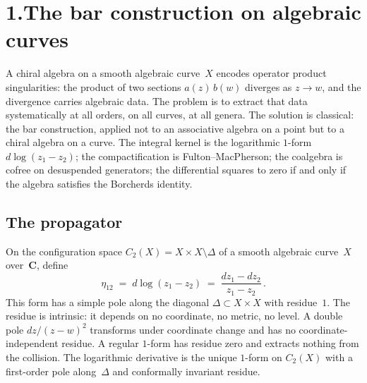 \providecommand{\cA}{\mathcal{A}}
\providecommand{\barB}{\overline{B}}
\providecommand{\gAmod}{\mathfrak{g}_{\cA}^{\mathrm{mod}}}
\providecommand{\MC}{\text{MC}}

\section*{1.\quad The bar construction on algebraic curves}

\medskip

\noindent
A chiral algebra on a smooth algebraic curve~$X$ encodes
operator product singularities: the product of two sections
$a(z)\,b(w)$ diverges as $z\to w$, and the divergence carries
algebraic data. The problem is to extract that data systematically
at all orders, on all curves, at all genera. The solution is
classical: the bar construction, applied not to an associative
algebra on a point but to a chiral algebra on a curve. The integral
kernel is the logarithmic $1$-form $d\log(z_1-z_2)$; the
compactification is Fulton--MacPherson; the coalgebra is cofree
on desuspended generators; the differential squares to zero if and
only if the algebra satisfies the Borcherds identity.

\subsection*{The propagator}

\noindent
On the configuration space $C_2(X) = X \times X \setminus \Delta$
of a smooth algebraic curve~$X$ over~$\mathbf{C}$, define
\begin{equation}\label{eq:pf1-eta}
\eta_{12} \;=\; d\log(z_1 - z_2)
\;=\; \frac{dz_1 - dz_2}{z_1 - z_2}\,.
\end{equation}
This form has a simple pole along the diagonal $\Delta \subset
X \times X$ with residue~$1$. The residue is intrinsic: it depends
on no coordinate, no metric, no level. A double pole
$dz/(z-w)^2$ transforms under coordinate change and has no
coordinate-independent residue. A regular $1$-form has residue
zero and extracts nothing from the collision. The logarithmic
derivative is the unique $1$-form on $C_2(X)$ with a first-order
pole along~$\Delta$ and conformally invariant residue.

